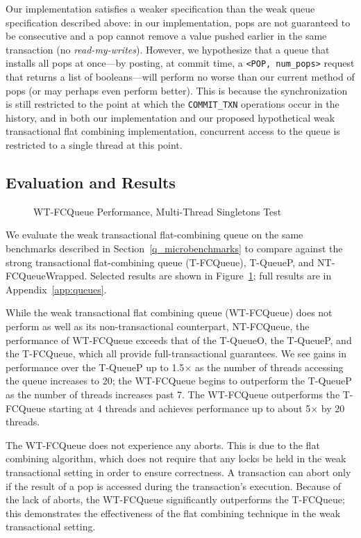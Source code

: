 Our implementation satisfies a weaker specification than the weak queue specification described above: in our implementation, pops are not guaranteed to be consecutive and a pop cannot remove a value pushed earlier in the same transaction (no \emph{read-my-writes}). However, we hypothesize that a queue that installs all pops at once---by posting, at commit time, a \texttt{<POP, num\_pops>} request that returns a list of booleans---will perform no worse than our current method of pops (or may perhaps even perform better). This is because the synchronization is still restricted to the point at which the \texttt{COMMIT\_TXN} operations occur in the history, and in both our implementation and our proposed hypothetical weak transactional flat combining implementation, concurrent access to the queue is restricted to a single thread at this point.

\subsection{Evaluation and Results}

\begin{figure}[t]
    \centering
    \caption{WT-FCQueue Performance, Multi-Thread Singletons Test}
    \label{fig:wtqs}
\end{figure}

We evaluate the weak transactional flat-combining queue on the same benchmarks described in Section~\ref{q_microbenchmarks} to compare against the strong transactional flat-combining queue (T-FCQueue), T-QueueP, and NT-FCQueueWrapped. Selected results are shown in Figure~\ref{fig:wtqs}; full results are in Appendix~\ref{app:queues}. 

While the weak transactional flat combining queue (WT-FCQueue) does not perform as well as its non-transactional counterpart, NT-FCQueue, the performance of WT-FCQueue exceeds that of the T-QueueO, the T-QueueP, and the T-FCQueue, which all provide full-transactional guarantees. We see gains in performance over the T-QueueP up to 1.5$\times$ as the number of threads accessing the queue increases to 20; the WT-FCQueue begins to outperform the T-QueueP as the number of threads increases past 7. The WT-FCQueue outperforms the T-FCQueue starting at 4 threads and achieves performance up to about 5$\times$ by 20 threads.
 
The WT-FCQueue does not experience any aborts. This is due to the flat combining algorithm, which does not require that any locks be held in the weak transactional setting in order to ensure correctness. A transaction can abort only if the result of a pop is accessed during the transaction's execution.
Because of the lack of aborts, the WT-FCQueue significantly outperforms the T-FCQueue; this demonstrates the effectiveness of the flat combining technique in the weak transactional setting. 

